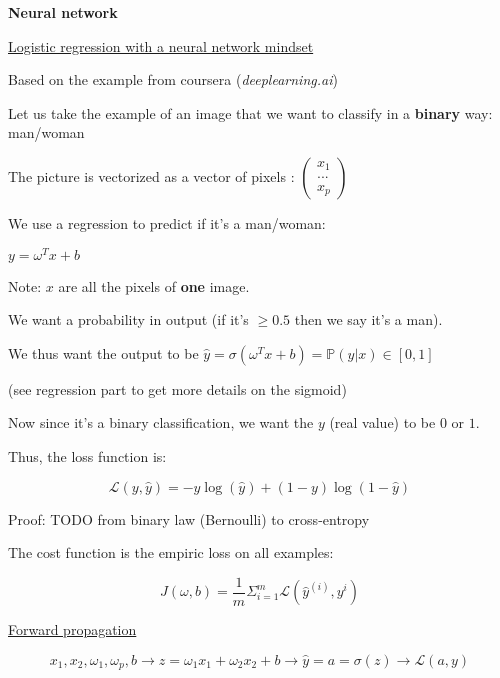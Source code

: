 {\fontsize{12pt}{22pt} \textbf{Neural network}\par}

\vspace{5mm}

\underline{Logistic regression with a neural network mindset}

Based on the example from coursera (\textit{deeplearning.ai})

Let us take the example of an image that we want to classify in a \textbf{binary} way: man/woman

The picture is vectorized as a vector of pixels : $\begin{pmatrix}x_1\\...\\x_p\end{pmatrix}$

We use a regression to predict if it's a man/woman:

$y=\omega^Tx + b$

Note: $x$ are all the pixels of \textbf{one} image.

\vspace{5mm}

We want a probability in output (if it's $\ge 0.5$ then we say it's a man).

We thus want the output to be $\widehat{y}=\sigma(\omega^Tx + b)=\mathbb{P}(y|x) \in [0,1]$

(see regression part to get more details on the sigmoid)

\vspace{5mm}

Now since it's a binary classification, we want the $y$ (real value) to be $0$ or $1$.

Thus, the loss function is:

$$\mathcal{L}(y, \widehat{y})=-y\log(\widehat{y})+(1-y)\log(1-\widehat{y})$$

Proof: TODO from binary law (Bernoulli) to cross-entropy

\vspace{5mm}

The cost function is the empiric loss on all examples:

$$J(\omega, b)=\frac{1}{m}\Sigma_{i=1}^m\mathcal{L}(\widehat{y}^{(i)}, y^i)$$

\vspace{5mm}

\underline{Forward propagation}

$$x_1,x_2, \omega_1,\omega_p,b \to z=\omega_1x_1 + \omega_2x_2 + b \to \widehat{y}=a=\sigma(z) \to \mathcal{L}(a,y)$$

